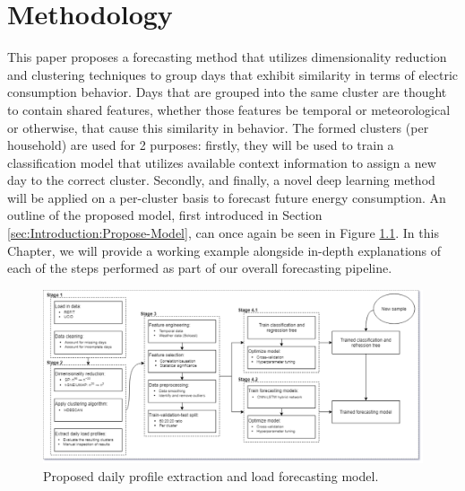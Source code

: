 \chapter{Methodology}
\label{ch:Methodology}
This paper proposes a forecasting method that utilizes dimensionality reduction and clustering techniques to group days that exhibit similarity in terms of electric consumption behavior. Days that are grouped into the same cluster are thought to contain shared features, whether those features be temporal or meteorological or otherwise, that cause this similarity in behavior. The formed clusters (per household) are used for 2 purposes: firstly, they will be used to train a classification model that utilizes available context information to assign a new day to the correct cluster. Secondly, and finally, a novel deep learning method will be applied on a per-cluster basis to forecast future energy consumption. An outline of the proposed model, first introduced in Section \ref{sec:Introduction:Propose-Model}, can once again be seen in Figure \ref{fig:Proposed-Model}. In this Chapter, we will provide a working example alongside in-depth explanations of each of the steps performed as part of our overall forecasting pipeline.

\begin{figure}[H]
    \begin{adjustwidth}{-3.0cm}{-3.0cm}%
        \centering
        \includegraphics[width=\linewidth]{Images/Chapter 5/Other/Proposed-Model.pdf}
        \caption{Proposed daily profile extraction and load forecasting model.}
        \label{fig:Proposed-Model}
    \end{adjustwidth}
\end{figure}


